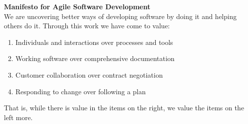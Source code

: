 \textbf{Manifesto for Agile Software Development }\\
We are uncovering better ways of developing
software by doing it and helping others do it.
Through this work we have come to value:

\begin{enumerate}
    \item  Individuals and interactions over processes and tools
    \item Working software over comprehensive documentation
        \item Customer collaboration over contract negotiation
        \item Responding to change over following a plan 
\end{enumerate}

That is, while there is value in the items on the right, we value the items on the left more. 
